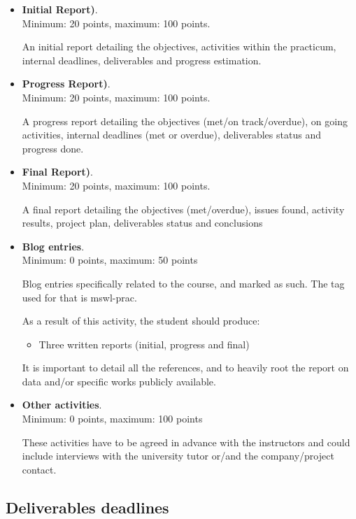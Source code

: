\documentclass[a4paper]{article}
\begin{document}
\begin{itemize}
\item \textbf{Initial Report)}. \\
  Minimum: 20 points, maximum: 100 points.

  An initial report detailing the objectives, activities within the practicum, internal deadlines, deliverables and progress estimation. 

\item \textbf{Progress Report)}. \\
  Minimum: 20 points, maximum: 100 points.

  A progress report detailing the objectives (met/on track/overdue), on going activities, internal deadlines (met or overdue), deliverables status and progress done.

\item \textbf{Final Report)}. \\
  Minimum: 20 points, maximum: 100 points.

  A final report detailing the objectives (met/overdue), issues found, activity results, project plan, deliverables status and conclusions


\item \textbf{Blog entries}. \\
  Minimum: 0 points, maximum: 50 points

  Blog entries specifically related to the course, and marked as such. The tag used for that is mswl-prac.


As a result of this activity, the student should produce:

\begin{itemize}
\item Three written reports (initial, progress and final)
\end{itemize}

 It is important to detail all the references, and to heavily root the report on data and/or specific works publicly available.

\item \textbf{Other activities}. \\
  Minimum: 0 points, maximum: 100 points

  These activities have to be agreed in advance with the instructors and could include interviews with the university tutor or/and the company/project contact.
\end{itemize}

\subsection{Deliverables deadlines}
\end{document}
